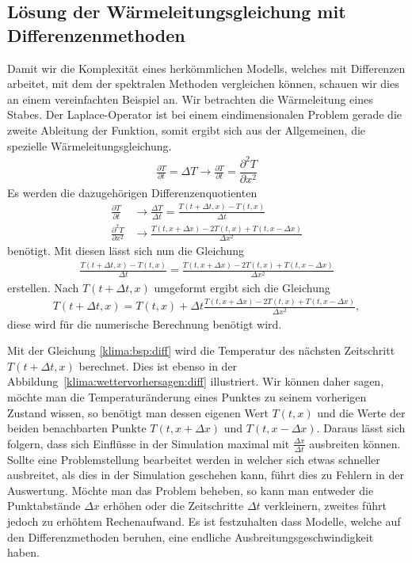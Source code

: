\begin{refsection}
\subsection{Lösung der Wärmeleitungsgleichung mit Differenzenmethoden}
Damit wir die Komplexität eines herkömmlichen Modells, welches mit Differenzen arbeitet, mit dem der spektralen Methoden vergleichen können, schauen wir dies an einem vereinfachten Beispiel an. Wir betrachten die Wärmeleitung eines Stabes.
Der Laplace-Operator ist bei einem eindimensionalen Problem gerade die zweite Ableitung der Funktion, somit ergibt sich aus der Allgemeinen, die spezielle Wärmeleitungsgleichung.
\begin{align}
\frac{\partial T}{\partial t} = \Delta T \rightarrow \frac{\partial T}{\partial t}=\dfrac{\partial^2 T}{\partial x^2}
\end{align}
Es werden die dazugehörigen Differenzenquotienten
\begin{align}
\frac{\partial T}{\partial t}
&\rightarrow
\frac{\Delta T}{\Delta t}=
\frac{T(t+\Delta t,x)-T(t,x)}{\Delta t}
\\
\frac{\partial^2 T}{\partial x^2}
&\rightarrow
\frac{T(t,x+\Delta x)-2T(t,x)+T(t,x-\Delta x)}{\Delta x^2}
\end{align}
benötigt. Mit diesen lässt sich nun die Gleichung
\begin{align}
\frac{T(t+\Delta t,x)-T(t,x)}{\Delta t}
=
\frac{T(t,x+\Delta x)-2T(t,x)+T(t,x-\Delta x)}{\Delta x^2}
\end{align}
erstellen. Nach $T(t+\Delta t,x)$ umgeformt ergibt sich die Gleichung
\begin{align}
T(t+\Delta t,x)
=
T(t,x)+\Delta t \frac{T(t,x+\Delta x)-2T(t,x)+T(t,x-\Delta x)}{\Delta x^2},
\label{klima:bsp:diff}
\end{align}
diese wird für die numerische Berechnung benötigt wird.

Mit der Gleichung \eqref{klima:bsp:diff} wird die Temperatur des nächsten Zeitschritt $T(t+\Delta t,x)$ berechnet. Dies ist ebenso in der Abbildung~\ref{klima:wettervorhersagen:diff} illustriert. Wir können daher sagen, möchte man die Temperaturänderung eines Punktes zu seinem vorherigen Zustand wissen, so benötigt man dessen eigenen Wert $T(t,x)$ und die Werte der beiden benachbarten Punkte $T(t,x+\Delta x)$ und $T(t,x-\Delta x)$. Daraus lässt sich folgern, dass sich Einflüsse in der Simulation maximal mit $\frac{\Delta x}{\Delta t}$ ausbreiten können. Sollte eine Problemstellung bearbeitet werden in welcher sich etwas schneller ausbreitet, als dies in der Simulation geschehen kann, führt dies zu Fehlern in der Auswertung. Möchte man das Problem beheben, so kann man entweder die Punktabstände $\Delta x$ erhöhen oder die Zeitschritte $\Delta t$ verkleinern, zweites führt jedoch zu erhöhtem Rechenaufwand. Es ist festzuhalten dass Modelle, welche auf den Differenzmethoden beruhen, eine endliche Ausbreitungsgeschwindigkeit haben.


\end{refsection}
